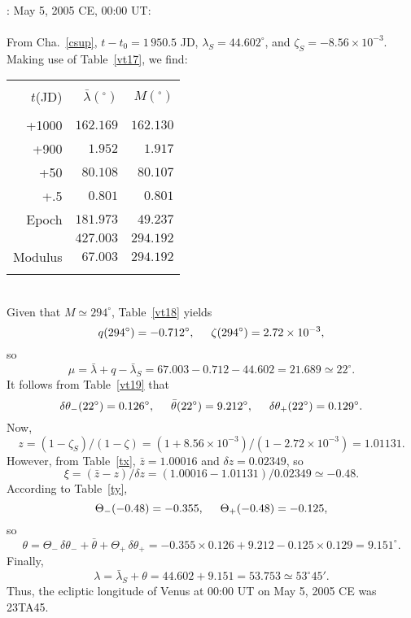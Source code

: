 ~\\
: May 5,  2005 CE, 00:00 UT:\\
~\\
From Cha.~\ref{csup}, $t-t_0=1\,950.5$ JD, $\lambda_S= 44.602^\circ$, and
$\zeta_S= -8.56\times 10^{-3}$. Making use of
Table~\ref{vt17}, we find:\\
\begin{tabular}{rrr}
&&\\
$t$(JD) & $ \bar{\lambda}(^\circ)$ & $M(^\circ)$\\[-2ex]
&&\\
+1000 & $162.169$ & $162.130$\\
+900 & $1.952$ & $1.917$\\
+50 & $80.108$ & $80.107$\\
+.5 & $0.801$ & $0.801$\\
Epoch & $181.973$ & $49.237$\\\cline{2-3}
&$427.003$ & $294.192$\\\cline{2-3}
Modulus & $67.003$ & $294.192$\\ 
&&\\
\end{tabular}\\
Given that $M\simeq 294^\circ$, Table~\ref{vt18} yields 
$$
q(294^\circ)= -0.712^\circ, \mbox{\hspace{0.5cm}}\zeta(294^\circ)=2.72\times 10^{-3},
$$
so
$$
\mu=\bar{\lambda}+q-\bar{\lambda}_S = 67.003-0.712-44.602= 21.689\simeq
22^\circ.
$$
It follows from Table~\ref{vt19}
that 
$$
\delta\theta_-(22^\circ) = 0.126^\circ,\mbox{\hspace{0.5cm}}\bar{\theta}(22^\circ)=9.212^\circ, \mbox{\hspace{0.5cm}}\delta\theta_+(22^\circ) = 0.129^\circ.
$$
Now, 
$$
z= (1-\zeta_S)/(1-\zeta) = (1+8.56\times 10^{-3})/(1-2.72\times 10^{-3}) =
1.01131.
$$
However, from Table~\ref{tx}, $\bar{z}= 1.00016$ and $\delta z = 0.02349$, so
$$
\xi = (\bar{z}-z)/\delta z = (1.00016-1.01131)/0.02349 \simeq -0.48.
$$
According to Table~\ref{ty}, 
$$
\Theta_-(-0.48) = -0.355, \mbox{\hspace{0.5cm}}\Theta_+(-0.48) = -0.125,
$$
so
$$
\theta  = \Theta_-\,\delta\theta_- + \bar{\theta}+\Theta_+\,\delta\theta_+ = -0.355\times 0.126 + 9.212-0.125\times 0.129 = 9.151^\circ.
$$
Finally,
$$
\lambda=\bar{\lambda}_S + \theta= 44.602+9.151=53.753 \simeq 53^\circ 45'. 
$$
Thus,
the ecliptic longitude of Venus at 00:00 UT on May 5, 2005 CE was 23TA45.

